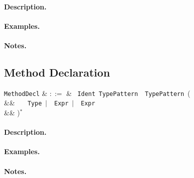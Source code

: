 \paragraph{Description.}

\paragraph{Examples.}

\paragraph{Notes.}


\subsection{Method Declaration}

\begin{syntax}
  \verb+MethodDecl+ & $::=$ & \ \verb+Ident+\
  \verb+TypePattern+\ \token{=>}\ \verb+TypePattern+\ \big(\\
  && \ \ \ \verb+Type+\ $|$\ \
  \verb+Expr+\ $|$\ \ \verb+Expr+\\
  && \big)$^*$\ \token{:}\\
\end{syntax}

\paragraph{Description.}

\paragraph{Examples.}

\paragraph{Notes.}




